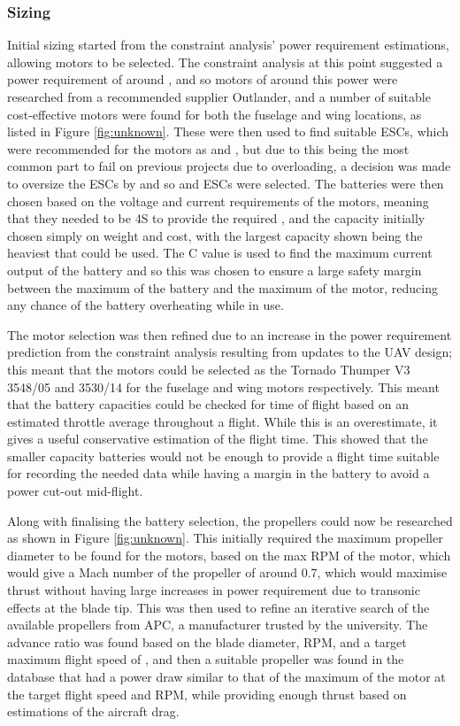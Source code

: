 \documentclass[../../main.tex]{subfiles}
\begin{document}
\subsubsection{Sizing} \label{sec:design-process:preliminary-design:propulsion:sizing}

Initial sizing started from the constraint analysis' power requirement estimations, allowing motors to be selected.
The constraint analysis at this point suggested a power requirement of around , and so motors of around this power were researched from a recommended supplier Outlander, and a number of suitable cost-effective motors were found for both the fuselage and wing locations, as listed in Figure \ref{fig:unknown}.  %
These were then used to find suitable ESCs, which were recommended for the motors as  and , but due to this being the most common part to fail on previous projects due to overloading, a decision was made to oversize the ESCs by  and so  and  ESCs were selected.
The batteries were then chosen based on the voltage and current requirements of the motors, meaning that they needed to be 4S to provide the required , and the capacity initially chosen simply on weight and cost, with the largest capacity shown being the heaviest that could be used.
The C value is used to find the maximum current output of the battery and so this was chosen to ensure a large safety margin between the maximum of the battery and the maximum of the motor, reducing any chance of the battery overheating while in use. 

The motor selection was then refined due to an increase in the power requirement prediction from the constraint analysis resulting from updates to the UAV design; this meant that the motors could be selected as the Tornado Thumper V3 3548/05 and 3530/14 for the fuselage and wing motors respectively.
This meant that the battery capacities could be checked for time of flight based on an estimated  throttle average throughout a flight.
While this is an overestimate, it gives a useful conservative estimation of the flight time.
This showed that the smaller capacity batteries would not be enough to provide a flight time suitable for recording the needed data while having a margin in the battery to avoid a power cut-out mid-flight.

Along with finalising the battery selection, the propellers could now be researched as shown in Figure \ref{fig:unknown}.
This initially required the maximum propeller diameter to be found for the motors, based on the max RPM of the motor, which would give a Mach number of the propeller of around 0.7, which would maximise thrust without having large increases in power requirement due to transonic effects at the blade tip.
This was then used to refine an iterative search of the available propellers from APC, a manufacturer trusted by the university.
The advance ratio was found based on the blade diameter, RPM, and a target maximum flight speed of , and then a suitable propeller was found in the database that had a power draw similar to that of the maximum of the motor at the target flight speed and RPM, while providing enough thrust based on estimations of the aircraft drag.
\end{document}
